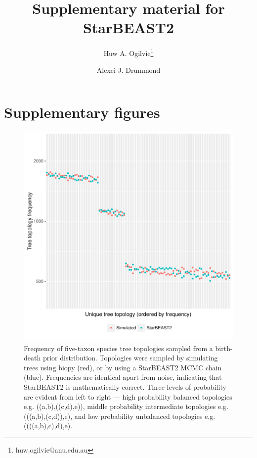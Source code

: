 \documentclass[12pt]{article}
\begin{document}
\title{Supplementary material for StarBEAST2}
\author[1,2]{Huw A. Ogilvie\thanks{huw.ogilvie@anu.edu.au}}
\author[2,3]{Alexei J. Drummond}

\maketitle

\clearpage

\section{Supplementary figures}

\justifying

\begin{figure}[htb!]
\centering
\includegraphics[width=16cm]{species_topology_frequencies.pdf}
\caption
{Frequency of five-taxon species tree topologies sampled from a birth-death prior
distribution. Topologies were sampled by simulating trees using biopy (red), or
by using a StarBEAST2 MCMC chain (blue). Frequencies are identical apart from
noise, indicating that StarBEAST2 is mathematically correct. Three levels of
probability are evident from left to right --- high probability balanced
topologies e.g. ((a,b),((c,d),e)), middle probability intermediate topologies
e.g. (((a,b),(c,d)),e), and low probability unbalanced topologies e.g.
((((a,b),c),d),e).}
\label{fig:speciesTopologyFrequencies}
\end{figure}
\end{document}
